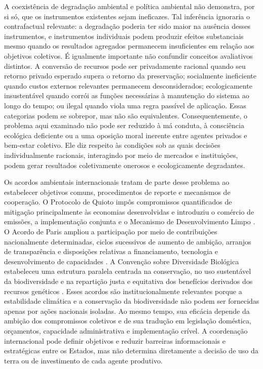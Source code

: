 A coexistência de degradação ambiental e política ambiental não demonstra, por si só, que os instrumentos existentes sejam ineficazes. Tal inferência ignoraria o contrafactual relevante: a degradação poderia ter sido maior na ausência desses instrumentos, e instrumentos individuais podem produzir efeitos substanciais mesmo quando os resultados agregados permanecem insuficientes em relação aos objetivos coletivos. É igualmente importante não confundir conceitos avaliativos distintos. A conversão de recursos pode ser privadamente racional quando seu retorno privado esperado supera o retorno da preservação; socialmente ineficiente quando custos externos relevantes permanecem desconsiderados; ecologicamente insustentável quando corrói as funções necessárias à manutenção do sistema ao longo do tempo; ou ilegal quando viola uma regra passível de aplicação. Essas categorias podem se sobrepor, mas não são equivalentes. Consequentemente, o problema aqui examinado não pode ser reduzido à má conduta, à consciência ecológica deficiente ou a uma oposição moral inerente entre agentes privados e bem-estar coletivo. Ele diz respeito às condições sob as quais decisões individualmente racionais, interagindo por meio de mercados e instituições, podem gerar resultados coletivamente onerosos e ecologicamente degradantes.


Os acordos ambientais internacionais tratam de parte desse problema ao estabelecer objetivos comuns, procedimentos de reporte e mecanismos de cooperação. O Protocolo de Quioto impôs compromissos quantificados de mitigação principalmente às economias desenvolvidas e introduziu o comércio de emissões, a implementação conjunta e o Mecanismo de Desenvolvimento Limpo \cite{unfccc1997kyoto}. O Acordo de Paris ampliou a participação por meio de contribuições nacionalmente determinadas, ciclos sucessivos de aumento de ambição, arranjos de transparência e disposições relativas a financiamento, tecnologia e desenvolvimento de capacidades \cite{unfccc2015paris}. A Convenção sobre Diversidade Biológica estabeleceu uma estrutura paralela centrada na conservação, no uso sustentável da biodiversidade e na repartição justa e equitativa dos benefícios derivados dos recursos genéticos \cite{cbd1992convention}. Esses acordos são institucionalmente relevantes porque a estabilidade climática e a conservação da biodiversidade não podem ser fornecidas apenas por ações nacionais isoladas. Ao mesmo tempo, sua eficácia depende da ambição dos compromissos coletivos e de sua tradução em legislação doméstica, orçamentos, capacidade administrativa e implementação crível. A coordenação internacional pode definir objetivos e reduzir barreiras informacionais e estratégicas entre os Estados, mas não determina diretamente a decisão de uso da terra ou de investimento de cada agente produtivo.

